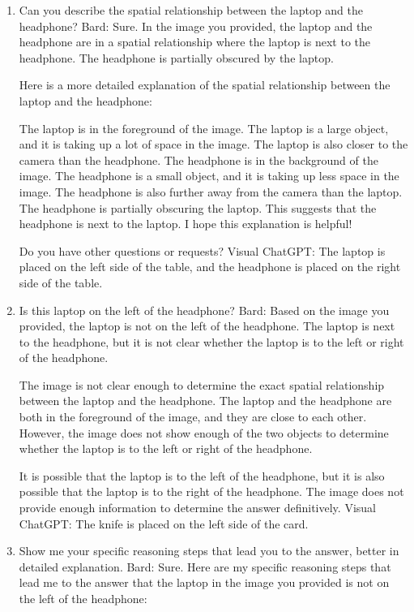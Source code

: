 \begin{enumerate}
    \item Can you describe the spatial relationship between the laptop and the headphone?
    \subitem Bard: 
    Sure. In the image you provided, the laptop and the headphone are in a spatial relationship where the laptop is next to the headphone. The headphone is partially obscured by the laptop.

    Here is a more detailed explanation of the spatial relationship between the laptop and the headphone:

    The laptop is in the foreground of the image. The laptop is a large object, and it is taking up a lot of space in the image. The laptop is also closer to the camera than the headphone.
    The headphone is in the background of the image. The headphone is a small object, and it is taking up less space in the image. The headphone is also further away from the camera than the laptop.
    The headphone is partially obscuring the laptop. This suggests that the headphone is next to the laptop.
    I hope this explanation is helpful!

    Do you have other questions or requests?
    \subitem Visual ChatGPT: The laptop is placed on the left side of the table, and the headphone is placed on the right side of the table.
    \item Is this laptop on the left of the headphone?
    \subitem Bard: 
    Based on the image you provided, the laptop is not on the left of the headphone. The laptop is next to the headphone, but it is not clear whether the laptop is to the left or right of the headphone.
    
    The image is not clear enough to determine the exact spatial relationship between the laptop and the headphone. The laptop and the headphone are both in the foreground of the image, and they are close to each other. However, the image does not show enough of the two objects to determine whether the laptop is to the left or right of the headphone.
    
    It is possible that the laptop is to the left of the headphone, but it is also possible that the laptop is to the right of the headphone. The image does not provide enough information to determine the answer definitively.
    \subitem Visual ChatGPT: The knife is placed on the left side of the card.
    \item Show me your specific reasoning steps that lead you to the answer, better in detailed explanation.
    \subitem Bard: 
    Sure. Here are my specific reasoning steps that lead me to the answer that the laptop in the image you provided is not on the left of the headphone:
    

\end{enumerate}
